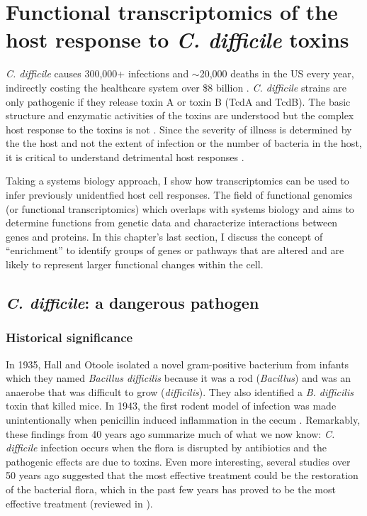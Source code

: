 \chapter[Functional transcriptomics of toxin response]{Functional transcriptomics of the host response to \textit{C. difficile} toxins}\label{chapter:introbmc}

\textit{C. difficile} causes 300,000+ infections and $\sim$20,000 deaths in the US every year,
indirectly costing the healthcare system over \${}8 billion \cite{Lucado:2012wl}.
\textit{C. difficile} strains are only pathogenic if
they release toxin A or toxin B (TcdA and TcdB).
The basic structure and enzymatic activities of the toxins
are understood but the complex host response to the toxins
is not \cite{Pruitt:2010cy,Pruitt:2012kx,Genisyuerek:2011dr,
Just:1995kz,Just:1995ei,Sun:2010kt}. 
Since the severity of illness is determined
by the the host and not the extent of infection
or the number of bacteria in the host, it is critical
to understand detrimental host responses \cite{ElFeghaly:2013gq}.

Taking a systems biology approach, I show how transcriptomics
can be used to infer previously unidentfied host cell responses.
The field of functional genomics (or functional transcriptomics) which overlaps
with systems biology and aims to determine functions from genetic data
and characterize interactions between genes and proteins. In this chapter's last section, I
discuss the concept of ``enrichment'' to identify
groups of genes or pathways that are altered 
and are likely to represent larger functional changes within the cell.

\section{\textit{C. difficile}: a dangerous pathogen}

\subsection{Historical significance}

In 1935, Hall and Otoole isolated a novel gram-positive bacterium from infants which
they named \textit{Bacillus difficilis} because it was a rod (\textit{Bacillus})
and was an anaerobe that was difficult to grow (\textit{difficilis}). 
They also identified a \textit{B. difficilis} toxin that killed mice.
In 1943, the first rodent model of infection was made unintentionally
when penicillin induced inflammation in the cecum \cite{Hamre:1943te}.
Remarkably, these findings from 40 years ago summarize
much of what we now know: \textit{C. difficile} infection occurs
when the flora is disrupted by antibiotics and the pathogenic
effects are due to toxins. Even more interesting, several
studies over 50 years ago suggested that the most effective treatment
could be the restoration of the bacterial flora, which
in the past few years has proved to be the most effective 
treatment (reviewed in \cite{Bartlett:2008jx}).

